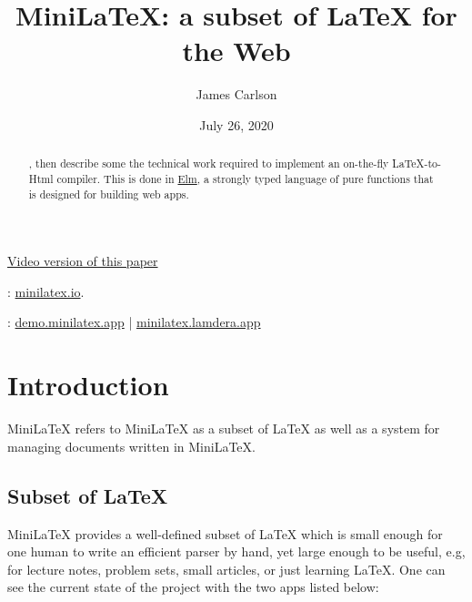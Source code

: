 \title{MiniLaTeX: a subset of LaTeX for the Web}
\author{James Carlson}
\date{July 26, 2020}

\maketitle

\tableofcontents


\href{https://youtu.be/TAIYpCc3VV0}{Video version of this paper}

\begin{abstract}
, then describe some the technical work required to implement an on-the-fly LaTeX-to-Html compiler.  This is done in \href{https://elm-lang.org}{Elm}, a strongly typed language of pure functions that is designed for building web apps.
\end{abstract}

: \href{https://minilatex.io}{minilatex.io}.

:  \href{https://demo.minilatex.app/}{demo.minilatex.app} |
\href{https://minilatex.lamdera.app/}{minilatex.lamdera.app}


\section{Introduction}

MiniLaTeX refers to MiniLaTeX as a subset of LaTeX as well as a system for managing documents written in MiniLaTeX.


\subsection{Subset of LaTeX}

MiniLaTeX provides a  well-defined subset of LaTeX which is small enough for one human to write an efficient parser by hand, yet large enough to be useful, e.g, for lecture notes, problem sets, small articles, or just learning LaTeX.  One can see the current state of the project with the two apps listed below:



